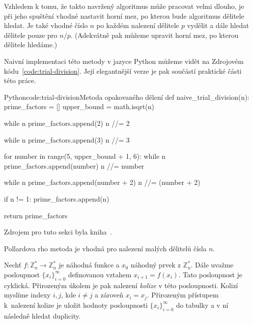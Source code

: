 \documentclass[
  program=infoi,
  biblatex=false,
  figures=true,
  glossaries,
  tables=false,
  sourcecodes=true,
  index
]{kidiplom}
\begin{document}
            \begin{remark}
                Vzhledem k tomu, že takto navržený algoritmus může pracovat velmi dlouho, je při jeho spuštění
                vhodné nastavit horní mez, po kterou bude algoritmus dělitele hledat.
                Je také vhodné číslo $n$ po každém nalezení dělitele $p$ vydělit a dále hledat dělitele pouze pro $n/p$.
                (Adekvátně pak můžeme upravit horní mez, po kterou dělitele hledáme.)
            \end{remark}

            Naivní implementaci této metody v jazyce Python můžeme vidět na Zdrojovém kódu~\ref{code:trial-division}.
            Její elegantnější verze je pak součástí praktické části této práce.
            
\begin{kicode}{Python}{code:trial-division}{Metoda opakovaného dělení}
def naive_trial_division(n):
    prime_factors = []
    upper_bound = math.isqrt(n)

    while n %
        prime_factors.append(2)
        n //= 2

    while n %
        prime_factors.append(3)
        n //= 3

    for number in range(5, upper_bound + 1, 6):
        while n %
            prime_factors.append(number)
            n //= number

        while n %
            prime_factors.append(number + 2)
            n //= (number + 2)

    if n != 1:
        prime_factors.append(n)

return prime_factors
\end{kicode}
       

        \label{sss:pollard-rho-method}

            Zdrojem pro tuto sekci byla kniha~\cite{handbook}.

            Pollardova rho metoda je vhodná pro nalezení malých dělitelů čísla $n$.

            Nechť $f: \mathbb{Z}^*_n \rightarrow \mathbb{Z}^*_n$ je náhodná funkce a $x_0$ náhodný prvek z $\mathbb{Z}^*_n$.
            Dále uvažme posloupnost $\{x_i\}^{\infty}_{i=0}$ definovanou vztahem $x_{i+1} = f(x_i)$.
            Tato posloupnost je cyklická.
            Přirozeným úkolem je pak nalezení \emph{kolize} v této posloupnosti.
            Kolizí myslíme indexy $i,j$, kde $i \neq j$ a zároveň $x_i = x_j$.
            Přirozeným přístupem k~nalezení kolize je uložit hodnoty posloupnosti $\{x_i\}^{\infty}_{i=0}$ do tabulky a v ní následně 
            hledat duplicity.
\end{document}
